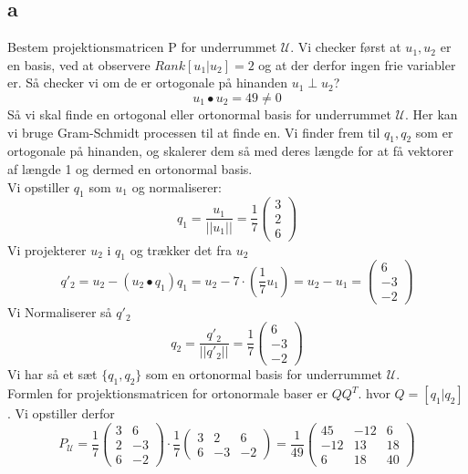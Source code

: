 \documentclass[a4paper,fleqn]{article}
\newcommand{\U}{\mathcal{U}}
\begin{document}
	\subsection{a}
	Bestem projektionsmatricen P for underrummet $\U$. Vi checker først at $u_1,u_2$ er en
	basis, ved at observere $Rank [u_1|u_2] = 2$ og at der derfor ingen frie variabler er.
	Så checker vi om de er ortogonale på hinanden $u_1 \perp u_2$?
	\[ u_1 \bullet u_2 = 49 \neq 0 \]
	Så vi skal finde en ortogonal eller ortonormal basis for underrummet $\U$. Her kan vi
	bruge Gram-Schmidt processen til at finde en. Vi finder frem til $q_1,q_2$ som er
	ortogonale på hinanden, og skalerer dem så med deres længde for at få vektorer af længde
	1 og dermed en ortonormal basis.\\
	Vi opstiller $q_1$ som $u_1$ og normaliserer:
	\[ q_1 = \frac{u_1}{||u_1||} = \frac{1}{7}\begin{pmatrix}3\\2\\6\end{pmatrix} \]
	Vi projekterer $u_2$ i $q_1$ og trækker det fra $u_2$
	\[ q'_2 = u_2 - (u_2\bullet q_1)q_1 = u_2 - 7 \cdot (\frac{1}{7}u_1) = u_2 - u_1 =
	\begin{pmatrix}6\\-3\\-2\end{pmatrix}\]
	Vi Normaliserer så $q'_2$ 
	\[ q_2 = \frac{q'_2}{||q'_2||} = \frac{1}{7}\begin{pmatrix}6\\-3\\-2\end{pmatrix}\]
	Vi har så et sæt $\{q_1,q_2\}$ som en ortonormal basis for underrummet $\U$.\\
	Formlen for projektionsmatricen for ortonormale baser er $QQ^T$. hvor $Q = [q_1|q_2]$. Vi
	opstiller derfor
	\[ P_\U = 
		\frac{1}{7}\left(\begin{array}{rr}
			3 & 6\\
			2 & -3\\
			6 & -2
		\end{array}\right)
		\cdot
		\frac{1}{7}\left(\begin{array}{rrr}
			3 & 2 & 6\\
			6 & -3 & -2
		\end{array}\right)
		= 
		\frac{1}{49}\begin{pmatrix}
			45&-12&6\\
			-12&13&18\\
			6&18&40
		\end{pmatrix}
	\]
\end{document}
